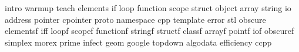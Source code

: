intro
warmup
teach
elements
if
loop
function
scope
struct
object
array
string
io
address
pointer
cpointer
proto
namespace
cpp
template
error
stl
obscure
elementsf
iff
loopf
scopef
functionf
stringf
structf
classf
arrayf
pointf
iof
obscuref
simplex
morex
prime
infect
geom
google
topdown
algodata
efficiency
ccpp
